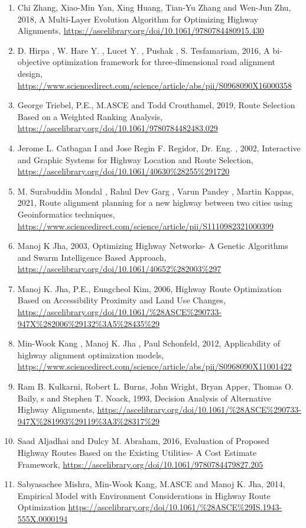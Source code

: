 \begin{enumerate}
\item Chi Zhang, Xiao-Min Yan, Xing Huang, Tian-Yu Zhang and Wen-Jun Zhu, 2018, A Multi-Layer Evolution Algorithm for Optimizing Highway Alignments, \url{https://ascelibrary.org/doi/10.1061/9780784480915.430 }
\item D. Hirpa , W. Hare Y. , Lucet Y. , Pushak , S. Tesfamariam, 2016, A bi-objective optimization framework for three-dimensional road alignment design, \url{https://www.sciencedirect.com/science/article/abs/pii/S0968090X16000358}
\item George Triebel, P.E., M.ASCE and Todd Crouthamel, 2019, Route Selection Based on a Weighted Ranking Analysis, \url{https://ascelibrary.org/doi/10.1061/9780784482483.029}
\item Jerome L. Catbagan I and Jose Regin F. Regidor, Dr. Eng. , 2002, Interactive and Graphic Systems for Highway Location and Route Selection, \url{https://ascelibrary.org/doi/10.1061/40630%28255%291720}
\item M. Surabuddin Mondal , Rahul Dev Garg , Varun Pandey , Martin Kappas, 2021, Route alignment planning for a new highway between two cities using Geoinformatics techniques, \url{https://www.sciencedirect.com/science/article/pii/S1110982321000399 }
\item Manoj K Jha, 2003, Optimizing Highway Networks- A Genetic Algorithms and Swarm Intelligence Based Approach, 
\url {https://ascelibrary.org/doi/10.1061/40652%282003%297 }
\item Manoj K. Jha, P.E., Eungcheol Kim, 2006, Highway Route Optimization Based on Accessibility Proximity and Land Use Changes, \url{https://ascelibrary.org/doi/10.1061/%28ASCE%290733-947X%282006%29132%3A5%28435%29 }
\item Min-Wook Kang , Manoj K. Jha , Paul Schonfeld, 2012, Applicability of highway alignment optimization models, \url{https://www.sciencedirect.com/science/article/abs/pii/S0968090X11001422 }
\item Ram B. Kulkarni, Robert L. Burns, John Wright, Bryan Apper, Thomas O. Baily, s and Stephen T. Noack, 1993, Decision Analysis of Alternative Highway Alignments, \url{https://ascelibrary.org/doi/10.1061/%28ASCE%290733-947X%281993%29119%3A3%28317%29 } 
\item Saad Aljadhai and Dulcy M. Abraham, 2016, Evaluation of Proposed Highway Routes Based on the Existing Utilities- A Cost Estimate Framework, \url{https://ascelibrary.org/doi/10.1061/9780784479827.205}
\item Sabyasachee Mishra, Min-Wook Kang, M.ASCE and Manoj K. Jha, 2014, Empirical Model with Environment Considerations in Highway Route Optimization \url{https://ascelibrary.org/doi/10.1061/%28ASCE%29IS.1943-555X.0000194}

\end{enumerate}

